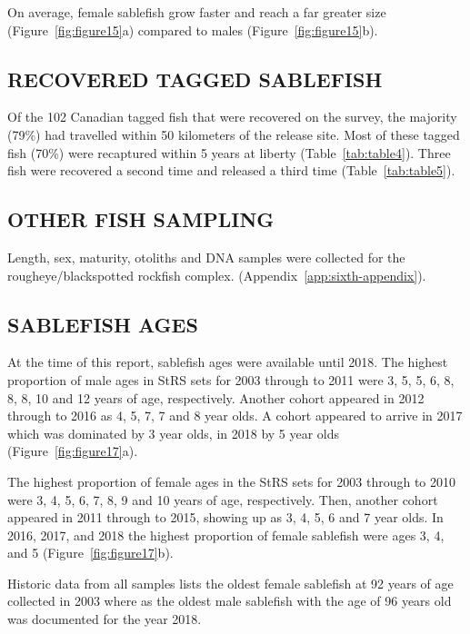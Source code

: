 \documentclass[12pt]{article}\usepackage[]{graphicx}\usepackage[]{color}
\begin{document}
On average, female sablefish grow faster and reach a far greater size (Figure~\ref{fig:figure15}a) compared to males (Figure~\ref{fig:figure15}b).

\hypertarget{recovered-tagged-sablefish}{%
\subsection{RECOVERED TAGGED SABLEFISH}\label{recovered-tagged-sablefish}}

Of the 102 Canadian tagged fish that were recovered on the survey, the majority (79\%) had travelled within 50 kilometers of the release site. Most of these tagged fish (70\%) were recaptured within 5 years at liberty (Table~\ref{tab:table4}). Three fish were recovered a second time and released a third time (Table~\ref{tab:table5}).

\hypertarget{other-fish-sampling}{%
\subsection{OTHER FISH SAMPLING}\label{other-fish-sampling}}

Length, sex, maturity, otoliths and DNA samples were collected for the rougheye/blackspotted rockfish complex. (Appendix~\ref{app:sixth-appendix}).

\hypertarget{sablefish-ages}{%
\subsection{SABLEFISH AGES}\label{sablefish-ages}}

At the time of this report, sablefish ages were available until 2018. The highest proportion of male ages in StRS sets for 2003 through to 2011 were 3, 5, 5, 6, 8, 8, 8, 10 and 12 years of age, respectively. Another cohort appeared in 2012 through to 2016 as 4, 5, 7, 7 and 8 year olds. A cohort appeared to arrive in 2017 which was dominated by 3 year olds, in 2018 by 5 year olds (Figure~\ref{fig:figure17}a).

The highest proportion of female ages in the StRS sets for 2003 through to 2010 were 3, 4, 5, 6, 7, 8, 9 and 10 years of age, respectively. Then, another cohort appeared in 2011 through to 2015, showing up as 3, 4, 5, 6 and 7 year olds. In 2016, 2017, and 2018 the highest proportion of female sablefish were ages 3, 4, and 5 (Figure~\ref{fig:figure17}b).

Historic data from all samples lists the oldest female sablefish at 92 years of age collected in 2003 where as the oldest male sablefish with the age of 96 years old was documented for the year 2018.
\end{document}
